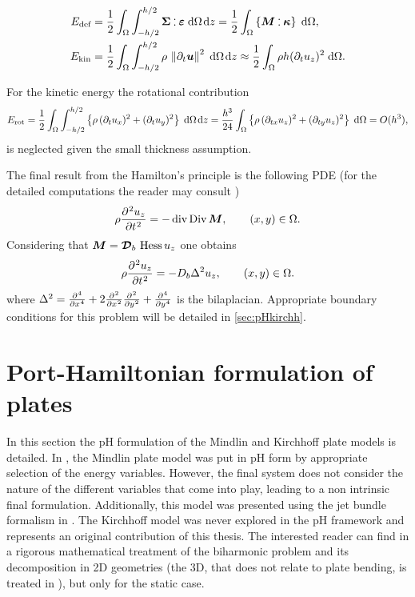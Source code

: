 \begin{align}
E_{\text{def}} &= \frac{1}{2} \int_{\Omega} \int_{-h/2}^{h/2} \bm{\Sigma} \cddot \bm{\varepsilon} \d{\Omega} \d{z} = \frac{1}{2} \int_{\Omega} \left\{\bm{M} \cddot \bm{\kappa}\right\}\d{\Omega}, \label{eq:defenKir}\\
E_{\text{kin}} &= \frac{1}{2}  \int_{\Omega} \int_{-h/2}^{h/2} \rho \, \norm{\partial_t \bm{u}}^2 \d{\Omega} \d{z} \approx \frac{1}{2} \int_{\Omega} \rho h (\partial_t u_z)^2  \d{\Omega}. \label{eq:kinenKir}
\end{align}
\begin{remark}\label{rmk:rotary}
For the kinetic energy the rotational contribution 
\begin{equation*}
E_{\text{rot}} =  \frac{1}{2}  \int_{\Omega} \int_{-h/2}^{h/2} \left\{\rho \, (\partial_t u_x)^2 + (\partial_t u_y)^2 \right\} \d{\Omega} \d{z} = \frac{h^3}{24} \int_{\Omega} \left\{\rho \, (\partial_{tx} u_z)^2 + (\partial_{ty} u_z)^2 \right\} \d{\Omega} = O(h^3),
\end{equation*}
is neglected given the small thickness assumption.
\end{remark}
The final result from the Hamilton's principle is the following PDE (for the detailed computations the reader may consult \cite[Chapter 3]{reddy2006theory})
\begin{equation}\label{eq:classKir}
\rho \diffp[2]{u_z}{t} = - \div\Div \bm{M}, \qquad (x,y) \in \Omega.
\end{equation}
Considering that $\bm{M}= \bm{\mathcal{D}}_b\, \operatorname*{Hess}{u_z}$ one obtains
\begin{equation*}
\rho \diffp[2]{u_z}{t} = - D_b \Delta^2 u_z, \qquad (x,y) \in \Omega.
\end{equation*}
where $\Delta^2 = \diffp[4]{}{x} + 2\diffp[2]{}{x}\diffp[2]{}{y} + \diffp[4]{}{y}$ is the bilaplacian. Appropriate boundary conditions for this problem will be detailed in \ref{sec:pHkirchh}.


\section{Port-Hamiltonian formulation of plates}
In this section the pH formulation of the Mindlin and Kirchhoff plate models is detailed. In \cite{macchelli2005mindlin}, the Mindlin plate model was put in pH form by appropriate selection of the energy variables. However, the final system does not consider the nature of the different variables that come into play, leading to a non intrinsic final formulation. Additionally, this model was presented using the jet bundle formalism in \cite{schoberl2017mindlin}. The Kirchhoff model was never explored in the pH framework and represents an original contribution of this thesis. The interested reader can find in \cite{rafetseder2018siam} a rigorous mathematical treatment of the biharmonic problem and its decomposition in 2D geometries (the 3D, that does not relate to plate bending, is treated in \cite{pauly2018divdiv}), but only for the static case. 

